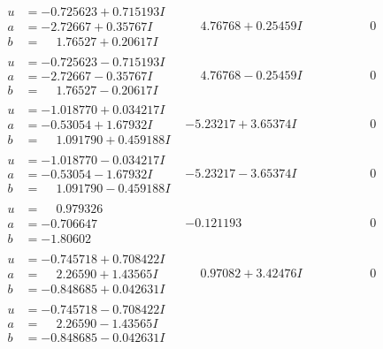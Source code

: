 \documentclass[1p]{elsarticle_modified}
\theoremstyle{definition}
\begin{document}
$$\begin{array}{c|c|c}
\begin{aligned}
u &= -0.725623 + 0.715193 I \\
a &= -2.72667 + 0.35767 I \\
b &= \phantom{-}1.76527 + 0.20617 I\end{aligned}
 & \phantom{-}4.76768 + 0.25459 I & \phantom{-0.000000 } 0 \\ \hline\begin{aligned}
u &= -0.725623 - 0.715193 I \\
a &= -2.72667 - 0.35767 I \\
b &= \phantom{-}1.76527 - 0.20617 I\end{aligned}
 & \phantom{-}4.76768 - 0.25459 I & \phantom{-0.000000 } 0 \\ \hline\begin{aligned}
u &= -1.018770 + 0.034217 I \\
a &= -0.53054 + 1.67932 I \\
b &= \phantom{-}1.091790 + 0.459188 I\end{aligned}
 & -5.23217 + 3.65374 I & \phantom{-0.000000 } 0 \\ \hline\begin{aligned}
u &= -1.018770 - 0.034217 I \\
a &= -0.53054 - 1.67932 I \\
b &= \phantom{-}1.091790 - 0.459188 I\end{aligned}
 & -5.23217 - 3.65374 I & \phantom{-0.000000 } 0 \\ \hline\begin{aligned}
u &= \phantom{-}0.979326\phantom{ +0.000000I} \\
a &= -0.706647\phantom{ +0.000000I} \\
b &= -1.80602\phantom{ +0.000000I}\end{aligned}
 & -0.121193\phantom{ +0.000000I} & \phantom{-0.000000 } 0 \\ \hline\begin{aligned}
u &= -0.745718 + 0.708422 I \\
a &= \phantom{-}2.26590 + 1.43565 I \\
b &= -0.848685 + 0.042631 I\end{aligned}
 & \phantom{-}0.97082 + 3.42476 I & \phantom{-0.000000 } 0 \\ \hline\begin{aligned}
u &= -0.745718 - 0.708422 I \\
a &= \phantom{-}2.26590 - 1.43565 I \\
b &= -0.848685 - 0.042631 I\end{aligned}

\end{array}$$
\end{document}
